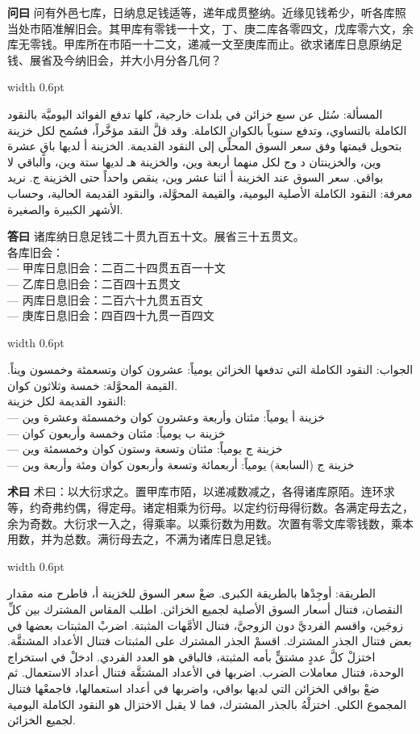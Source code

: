 \documentclass[11pt,a4paper]{article}
\newlength{\cnwidth}
\newlength{\arwidth}
\newcommand{\paralleltext}[2]{%
  \par\medskip\noindent
  \begin{minipage}[t]{\cnwidth}%
    \small #1%
  \end{minipage}%
  \hfill\textcolor{colrule}{\vrule width 0.6pt}\hfill
  \begin{minipage}[t]{\arwidth}%
    \small\arabicfont\beginR #2\endR%
  \end{minipage}%
  \par\medskip
}
\newcommand{\cnlabel}[1]{\textbf{\color{notecolor}#1}}
\newcommand{\arlabel}[1]{\arabicfontbf\color{notecolor}\beginR #1\endR}
\begin{document}
\paralleltext{%
\cnlabel{问曰} 问有外邑七库，日纳息足钱适等，递年成贯整纳。近缘见钱希少，听各库照当处市陌准解旧会。其甲库有零钱一十文，丁、庚二库各零四文，戊库零六文，余库无零钱。甲库所在市陌一十二文，递减一文至庚库而止。欲求诸库日息原纳足钱、展省及今纳旧会，并大小月分各几何？%
}{%
\arlabel{المسألة:} سُئل عن سبع خزائن في بلدات خارجية، كلها تدفع الفوائد اليوميَّة بالنقود الكاملة بالتساوي، وتدفع سنوياً بالكوان الكاملة. وقد قلَّ النقد مؤخَّراً، فسُمح لكل خزينة بتحويل قيمتها وفق سعر السوق المحلِّي إلى النقود القديمة. الخزينة أ لديها باقٍ عشرة وين، والخزينتان د وج لكل منهما أربعة وين، والخزينة هـ لديها ستة وين، والباقي لا بواقي. سعر السوق عند الخزينة أ اثنا عشر وين، ينقص واحداً حتى الخزينة ج. نريد معرفة: النقود الكاملة الأصلية اليومية، والقيمة المحوَّلة، والنقود القديمة الحالية، وحساب الأشهر الكبيرة والصغيرة.
}

\paralleltext{%
\cnlabel{答曰} 诸库纳日息足钱二十贯九百五十文。展省三十五贯文。\\
各库旧会：\\
--- 甲库日息旧会：二百二十四贯五百一十文\\
--- 乙库日息旧会：二百四十五贯文\\
--- 丙库日息旧会：二百六十九贯五百文\\
--- 庚库日息旧会：四百四十九贯一百四文%
}{%
\arlabel{الجواب:} النقود الكاملة التي تدفعها الخزائن يومياً: عشرون كوان وتسعمئة وخمسون ويناً. القيمة المحوَّلة: خمسة وثلاثون كوان.\\
النقود القديمة لكل خزينة:\\
--- خزينة أ يومياً: مئتان وأربعة وعشرون كوان وخمسمئة وعشرة وين\\
--- خزينة ب يومياً: مئتان وخمسة وأربعون كوان\\
--- خزينة ج يومياً: مئتان وتسعة وستون كوان وخمسمئة وين\\
--- خزينة ج (السابعة) يومياً: أربعمائة وتسعة وأربعون كوان ومئة وأربعة وين
}

\paralleltext{%
\cnlabel{术曰} 术曰：以大衍求之。置甲库市陌，以递减数减之，各得诸库原陌。连环求等，约奇弗约偶，得定母。诸定相乘为衍母。以定约衍母得衍数。各满定母去之，余为奇数。大衍求一入之，得乘率。以乘衍数为用数。次置有零文库零钱数，乘本用数，并为总数。满衍母去之，不满为诸库日息足钱。%
}{%
\arlabel{الطريقة:} أوجِدْها بالطريقة الكبرى. ضعْ سعر السوق للخزينة أ، فاطرح منه مقدار النقصان، فتنال أسعار السوق الأصلية لجميع الخزائن. اطلب المقاس المشترك بين كلِّ زوجَين، واقسم الفرديَّ دون الزوجيَّ، فتنال الأمَّهات المثبتة. اضربْ المثبتات بعضها في بعض فتنال الجذر المشترك. اقسمْ الجذر المشترك على المثبتات فتنال الأعداد المشتقَّة. اختزلْ كلَّ عددٍ مشتقٍّ بأمه المثبتة، فالباقي هو العدد الفردي. ادخلْ في استخراج الوحدة، فتنال معاملات الضرب. اضربها في الأعداد المشتقَّة فتنال أعداد الاستعمال. ثم ضعْ بواقي الخزائن التي لديها بواقي، واضربها في أعداد استعمالها، فاجمعْها فتنال المجموع الكلي. اختزلْهُ بالجذر المشترك، فما لا يقبل الاختزال هو النقود الكاملة اليومية لجميع الخزائن.
}
\end{document}
